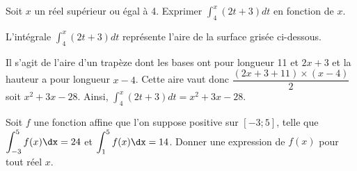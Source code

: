\documentclass[11pt,fleqn, openany]{book} %
\begin{document}
\begin{exercise}[topic=int01]Soit $x$ un réel supérieur ou égal à 4. Exprimer $\displaystyle\int_{4}^{x} (2t+3)dt$ en fonction de $x$.\end{exercise}

\begin{solution}

L'intégrale \(\displaystyle\int_{4}^{x} (2t+3)dt\) représente l'aire de la surface grisée ci-dessous.

\begin{center}
\end{center}


Il s'agit de l'aire d'un trapèze dont les bases ont pour longueur 11 et \(2x+3\) et la hauteur a pour longueur \(x-4\). Cette aire vaut donc \(\dfrac{(2x+3+11)\times (x-4)}{2}\) soit \(x^2+3x-28\). Ainsi,  \(\displaystyle\int_{4}^{x} (2t+3)dt=x^2+3x-28\).

\end{solution}



\begin{exercise}[topic=int01]Soit $f$ une fonction affine que l'on suppose positive sur $[-3;5]$, telle que $\displaystyle\int_{-3}^5 f(x)\dx=24$ et $\displaystyle\int_{1}^5 f(x)\dx=14$. Donner une expression de $f(x)$ pour tout réel $x$.\end{exercise}
\end{document}
